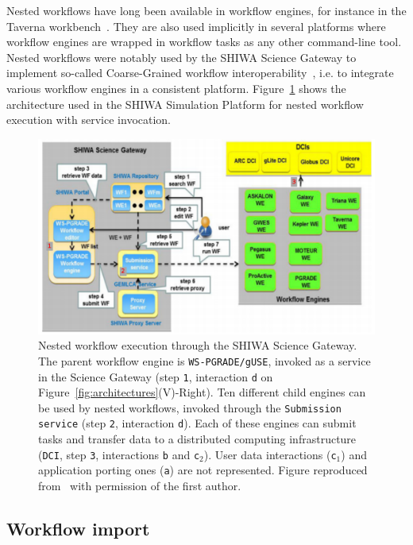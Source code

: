 \documentclass[preprint,3p,twocolumn]{elsarticle}
\begin{document}
Nested workflows have long been available in workflow engines, for
instance in the Taverna workbench~\cite{oinn2004taverna}. They are
also used implicitly in several platforms where workflow engines are
wrapped in workflow tasks as any other command-line tool. Nested
workflows were notably used by the SHIWA Science Gateway to implement
so-called Coarse-Grained workflow
interoperability~\cite{terstyanszky2014enabling}, i.e. to integrate
various workflow engines in a consistent
platform. Figure~\ref{fig:shiwa-architecture} shows the architecture
used in the SHIWA Simulation Platform for nested workflow execution
with service invocation.
\begin{figure}
\centering
\includegraphics[width=1.5\columnwidth]{figures/shiwa-science-gateway.pdf}
\caption{Nested workflow execution through the SHIWA Science Gateway. The
  parent workflow engine is \texttt{WS-PGRADE/gUSE}, invoked as a service
  in the Science Gateway (step \texttt{1}, interaction \texttt{d} on
  Figure~\ref{fig:architectures}(V)-Right). Ten different child engines can be used by nested
  workflows, invoked through the \texttt{Submission service} (step
  \texttt{2}, interaction \texttt{d}). Each of these engines can
  submit tasks and transfer data to a distributed computing
  infrastructure (\texttt{DCI}, step \texttt{3}, interactions
  \texttt{b} and \texttt{c$_2$}). User data interactions (\texttt{c$_1$}) and
  application porting ones (\texttt{a}) are not represented. Figure
  reproduced from~\cite{terstyanszky2014enabling} with permission of
  the first author.}
\label{fig:shiwa-architecture}
\end{figure}

\subsection{Workflow import}
\end{document}
